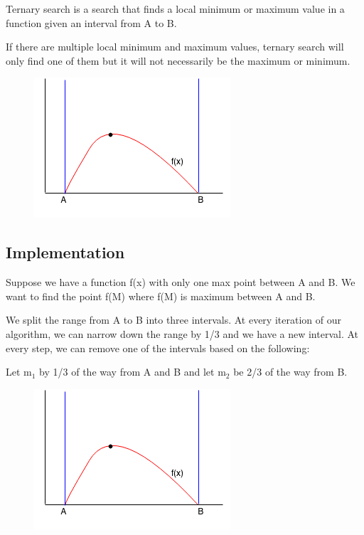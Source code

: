 \documentclass[11pt,oneside]{book}
\makeatletter
\def\maxwidth#1{\ifdim\Gin@nat@width>#1 #1\else\Gin@nat@width\fi}
\makeatother
\begin{document}
Ternary search is a search that finds a local minimum or maximum value in a function given an interval from A to B.

If there are multiple local minimum and maximum values, ternary search will only find one of them but it will not necessarily be the maximum or minimum.

\vspace{5px}\begin{figure}[H]\centering
        \includegraphics[width=0.66\maxwidth{\textwidth}]{ternarysearch.png}
        \end{figure}

\subsection{Implementation}

Suppose we have a function f(x) with only one max point between A and B. We want to find the point f(M) where f(M) is maximum between A and B.

We split the range from A to B into three intervals. At every iteration of our algorithm, we can narrow down the range by 1/3 and we have a new interval. At every step, we can remove one of the intervals based on the following:

Let m$_{1}$ by 1/3 of the way from A and B and let m$_{2}$ be 2/3 of the way from B.

\vspace{5px}\begin{figure}[H]\centering
        \includegraphics[width=0.66\maxwidth{\textwidth}]{ternarysearch.png}
        \end{figure}
\end{document}
